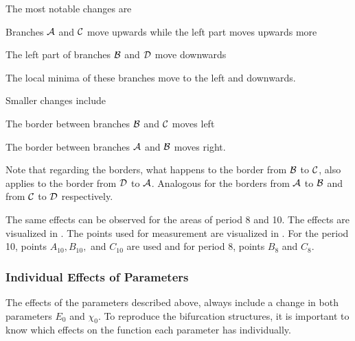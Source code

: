 The most notable changes are
\begin{enumerate*}
    \item Branches $\mathcal{A}$ and $\mathcal{C}$ move upwards while the left part moves upwards more
    \item The left part of branches $\mathcal{B}$ and $\mathcal{D}$ move downwards 
    \item The local minima of these branches move to the left and downwards.
\end{enumerate*}
Smaller changes include
\begin{enumerate*}
    \item The border between branches $\mathcal{B}$ and $\mathcal{C}$ moves left
    \item The border between branches $\mathcal{A}$ and $\mathcal{B}$ moves right.
\end{enumerate*}
Note that regarding the borders, what happens to the border from $\mathcal{B}$ to $\mathcal{C}$, also applies to the border from $\mathcal{D}$ to $\mathcal{A}$.
Analogous for the borders from $\mathcal{A}$ to $\mathcal{B}$ and from $\mathcal{C}$ to $\mathcal{D}$ respectively.

The same effects can be observed for the areas of period 8 and 10.
The effects are visualized in .
The points used for measurement are visualized in .
For the period 10, points $A_{10}, B_{10},$ and $C_{10}$ are used and for period 8, points $B_8$ and $C_8$.

\subsubsection{Individual Effects of Parameters}

The effects of the parameters described above, always include a change in both parameters $E_0$ and $\chi_0$.
To reproduce the bifurcation structures, it is important to know which effects on the function each parameter has individually.


